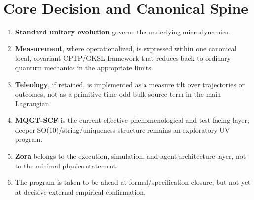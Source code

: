 \documentclass[reprint,amsmath,amssymb,aps,showkeys]{revtex4-2}
\begin{document}
\section{Core Decision and Canonical Spine}
\begin{enumerate}[leftmargin=*,label=(\arabic*)]
\item \textbf{Standard unitary evolution} governs the underlying microdynamics.
\item \textbf{Measurement}, where operationalized, is expressed within one canonical local, covariant CPTP/GKSL framework that reduces back to ordinary quantum mechanics in the appropriate limits.
\item \textbf{Teleology}, if retained, is implemented as a measure tilt over trajectories or outcomes, not as a primitive time-odd bulk source term in the main Lagrangian.
\item \textbf{MQGT-SCF} is the current effective phenomenological and test-facing layer; deeper SO(10)/string/uniqueness structure remains an exploratory UV program.
\item \textbf{Zora} belongs to the execution, simulation, and agent-architecture layer, not to the minimal physics statement.
\item The program is taken to be ahead at formal/specification closure, but not yet at decisive external empirical confirmation.
\end{enumerate}

\end{document}
